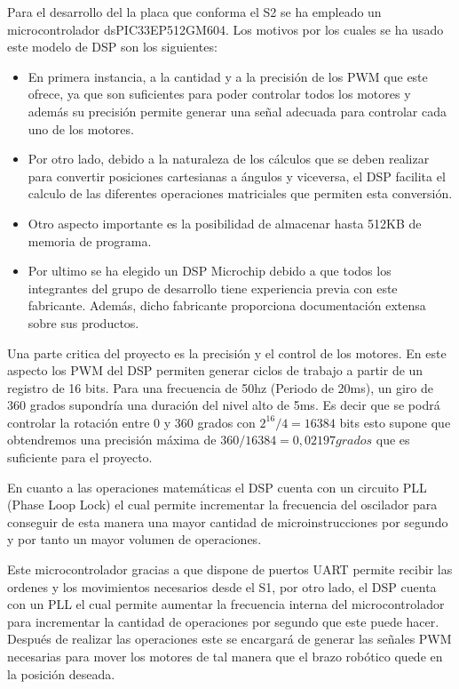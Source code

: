 Para el desarrollo del la placa que conforma el S2 se ha empleado un microcontrolador dsPIC33EP512GM604.
Los motivos por los cuales se ha usado este modelo de DSP son los siguientes: 

\begin{itemize}
\item En primera instancia, a la cantidad y a la precisión de los PWM que este ofrece, ya que son suficientes para poder controlar todos los motores y además su precisión permite generar una señal adecuada para controlar cada uno de los motores.

\item Por otro lado, debido a la naturaleza de los cálculos que se deben realizar para convertir posiciones cartesianas a ángulos y viceversa, el DSP facilita el calculo de las diferentes operaciones matriciales que permiten esta conversión.

\item Otro aspecto importante es la posibilidad de almacenar hasta 512KB de memoria de programa.

\item Por ultimo se ha elegido un DSP Microchip debido a que todos los integrantes del grupo de desarrollo tiene experiencia previa con este fabricante. Además, dicho fabricante proporciona documentación extensa sobre sus productos.

\end{itemize}

Una parte critica del proyecto es la precisión y el control de los motores. En este aspecto los PWM del DSP permiten generar ciclos de trabajo a partir de un registro de 16 bits. Para una frecuencia de 50hz (Periodo de 20ms), un giro de 360 grados supondría una duración del nivel alto de 5ms. Es decir que se podrá controlar la rotación entre 0 y 360 grados con $ 2^{16}/4 = 16384$ bits esto supone que obtendremos una precisión máxima de $360/16384 = 0,02197 grados$ que es suficiente para el proyecto.

En cuanto a las operaciones matemáticas el DSP cuenta con un circuito PLL (Phase Loop Lock) el cual permite incrementar la frecuencia del oscilador para conseguir de esta manera una mayor cantidad de microinstrucciones por segundo y por tanto un mayor volumen de operaciones.

Este microcontrolador gracias a que dispone de puertos UART permite recibir las ordenes y los movimientos necesarios desde el S1, por otro lado, el DSP cuenta con un PLL el cual permite aumentar la frecuencia interna del microcontrolador para incrementar la cantidad de operaciones por segundo que este puede hacer. Después de realizar las operaciones este se encargará de generar las señales PWM necesarias para mover los motores de tal manera que el brazo robótico quede en la posición deseada.





    
